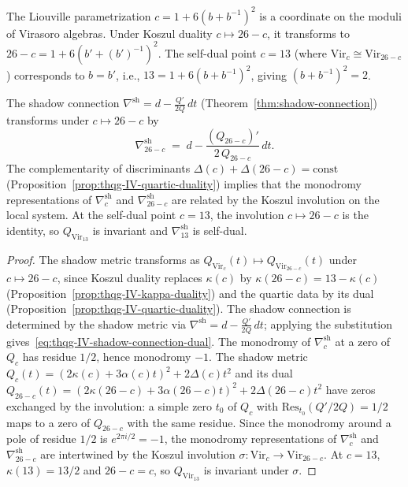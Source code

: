 \begin{remark}%
\label{rem:bpz-koszul-coordinate}%
%
The Liouville parametrization $c = 1 + 6(b + b^{-1})^2$ is a
coordinate on the moduli of Virasoro algebras. Under Koszul
duality $c \mapsto 26 - c$, it transforms to
$26 - c = 1 + 6(b' + (b')^{-1})^2$. The self-dual point
$c = 13$ (where $\mathrm{Vir}_c \cong \mathrm{Vir}_{26-c}$)
corresponds to $b = b'$, i.e., $13 = 1 + 6(b + b^{-1})^2$,
giving $(b + b^{-1})^2 = 2$.
\end{remark}

\begin{proposition}%
\label{prop:shadow-connection-s-duality}%
%
The shadow connection
$\nabla^{\mathrm{sh}} = d - \frac{Q'}{2Q}\,dt$
\textup{(}Theorem~\textup{\ref{thm:shadow-connection}}\textup{)}
transforms under $c \mapsto 26 - c$ by
\begin{equation}\label{eq:thqg-IV-shadow-connection-dual}
\nabla^{\mathrm{sh}}_{26-c}
\;=\;
d - \frac{(Q_{26-c})'}{2\,Q_{26-c}}\,dt.
\end{equation}
The complementarity of discriminants
$\Delta(c) + \Delta(26-c) = \mathrm{const}$
\textup{(}Proposition~\textup{\ref{prop:thqg-IV-quartic-duality}}\textup{)}
implies that the monodromy representations of
$\nabla^{\mathrm{sh}}_c$ and $\nabla^{\mathrm{sh}}_{26-c}$ are
related by the Koszul involution on the local system.
At the self-dual point $c = 13$, the involution $c \mapsto 26-c$
is the identity, so $Q_{\mathrm{Vir}_{13}}$ is invariant and
$\nabla^{\mathrm{sh}}_{13}$ is self-dual.
\end{proposition}

\begin{proof}
The shadow metric transforms as
$Q_{\mathrm{Vir}_c}(t) \mapsto Q_{\mathrm{Vir}_{26-c}}(t)$
under $c \mapsto 26 - c$, since Koszul duality replaces
$\kappa(c)$ by $\kappa(26-c) = 13 - \kappa(c)$
(Proposition~\ref{prop:thqg-IV-kappa-duality}) and the
quartic data by its dual
(Proposition~\ref{prop:thqg-IV-quartic-duality}).
The shadow connection is determined by the shadow metric via
$\nabla^{\mathrm{sh}} = d - \frac{Q'}{2Q}\,dt$; applying
the substitution gives~\eqref{eq:thqg-IV-shadow-connection-dual}.
The monodromy of $\nabla^{\mathrm{sh}}_c$ at a zero of $Q_c$ has
residue $1/2$, hence monodromy $-1$.
The shadow metric $Q_c(t) = (2\kappa(c) + 3\alpha(c)t)^2 + 2\Delta(c)t^2$ and its dual $Q_{26-c}(t) = (2\kappa(26-c) + 3\alpha(26-c)t)^2 + 2\Delta(26-c)t^2$ have zeros exchanged by the involution: a simple zero $t_0$ of $Q_c$ with $\mathrm{Res}_{t_0}(Q'/2Q) = 1/2$ maps to a zero of $Q_{26-c}$ with the same residue. Since the monodromy around a pole of residue $1/2$ is $e^{2\pi i/2} = -1$, the monodromy representations of $\nabla^{\mathrm{sh}}_c$ and $\nabla^{\mathrm{sh}}_{26-c}$ are intertwined by the Koszul involution $\sigma\colon \mathrm{Vir}_c \to \mathrm{Vir}_{26-c}$.
At $c = 13$, $\kappa(13) = 13/2$ and $26-c = c$, so $Q_{\mathrm{Vir}_{13}}$ is invariant under $\sigma$.
\end{proof}

